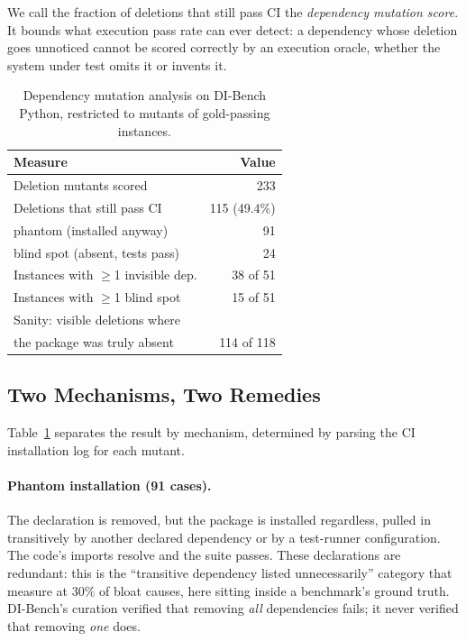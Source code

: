 \documentclass[11pt]{article}
\newcommand{\dibench}{DI-Bench}
\begin{document}
We call the fraction of deletions that still pass CI the \emph{dependency mutation score}.
It bounds what execution pass rate can ever detect: a dependency whose deletion goes unnoticed cannot be scored correctly by an execution oracle, whether the system under test omits it or invents it.

\begin{table}[t]
  \centering
  \begin{tabular}{lr}
    \hline
    \textbf{Measure} & \textbf{Value} \\
    \hline
    Deletion mutants scored & 233 \\
    Deletions that still pass CI & 115 (49.4\%) \\
    \quad phantom (installed anyway) & 91 \\
    \quad blind spot (absent, tests pass) & 24 \\
    Instances with $\geq$1 invisible dep. & 38 of 51 \\
    Instances with $\geq$1 blind spot & 15 of 51 \\
    \hline
    Sanity: visible deletions where & \\
    \quad the package was truly absent & 114 of 118 \\
    \hline
  \end{tabular}
  \caption{Dependency mutation analysis on \dibench{} Python, restricted to mutants of gold-passing instances.}
  \label{tab:mutation}
\end{table}

\subsection{Two Mechanisms, Two Remedies}

Table~\ref{tab:mutation} separates the result by mechanism, determined by parsing the CI installation log for each mutant.

\paragraph{Phantom installation (91 cases).}
The declaration is removed, but the package is installed regardless, pulled in transitively by another declared dependency or by a test-runner configuration.
The code's imports resolve and the suite passes.
These declarations are redundant: this is the ``transitive dependency listed unnecessarily'' category that \citet{drosos2024bloat} measure at 30\% of bloat causes, here sitting inside a benchmark's ground truth.
\dibench's curation verified that removing \emph{all} dependencies fails; it never verified that removing \emph{one} does.
\end{document}
